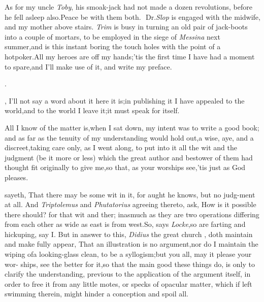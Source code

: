 \documentclass{article}
\begin{document}
As for my uncle \textit{Toby}, his smoak-jack
had not made a dozen revolutions, before
he fell asleep also.\tsh Peace be with
them both.\,\tsk\, Dr.\@ \textit{Slop} is engaged with the
midwife,
and my mother above stairs.\tsk\break
\textit{Trim} is busy in turning an old pair of jack-boots
into a couple of mortars, to be employed in the siege of
\textit{Messina} next summer,\tsk and is this instant boring
the touch holes with the point of a hot\break poker.\tsh All
my heroes are off my hands;\tsh ’tis the first time I have
had a moment to spare,\tsk and I’ll make use of it, and
write my preface.  \vfil {}

\newpage
\centerline{}
\bigskip
\centerline{\Large{}.}

\vspace{\parskip}

, I’ll not say a word about it\tsk\break
here it is;\tsk in publishing it\tsk\break
I have appealed to the world,\tsh and to the world I leave
it;\tsk it must speak for itself.

All I know of the matter is,\tsk when I sat down, my intent was
to write a good book; and as far as the tenuity of my understanding
would hold out,\tsk a wise, aye, and a discreet,\tsk taking care
only, as I went along, to put into it all the wit and the judgment
(be it more or less) which the great author and bestower of them
had thought fit originally to give
me,\tsh so that, as your
worships see,\tsk ’tis just as God pleases.

\noindent
{}
sayeth, That there may be some wit in it, for aught he
knows,\tsk
but no judg-\break ment at all. And \textit{Triptolemus} and \textit{Phutatorius}
agreeing thereto, ask, How is it possible there should?
for that wit and
ther;  inasmuch as they are two operations differing
from each other as wide as east is from west.\tsk So, says
\textit{Locke},\tsk so are farting and hickuping, say I. But
in answer to this, \textit{Didius} the great church \break{}, doth maintain and
make fully appear, That an illustration is no
argument,\tsk nor do I maintain the wiping of\break a
looking-glass clean, to be a syllogism;\break\tsk but you all, may it
please your wor- ships, see the better for it,\tsh so that
the main good these things do, is only to clarify the understanding,
previous to the application of the argument itself, in order to
free it from any little motes, or specks of opacular matter, which
if left swimming therein, might hinder a conception and spoil
all.
\end{document}
